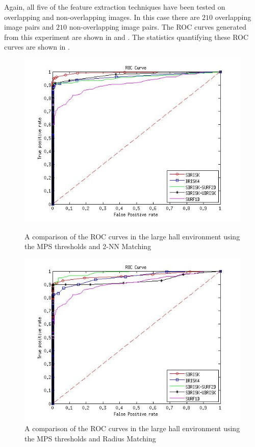Again, all five of the feature extraction techniques have been tested on overlapping and non-overlapping images. In this case there are $210$ overlapping image pairs and $210$ non-overlapping image pairs. The ROC curves generated from this experiment are shown in  and . The statistics quantifying these ROC curves are shown in .\\

\begin{figure}[h!]
\begin{minipage}[b]{0.5\linewidth}
\includegraphics[scale=0.4]{../Drawings/dataset3_ROC_General_KNN.jpg}
\caption{A comparison of the ROC curves in the large hall environment using the MPS thresholds and 2-NN Matching}
\label{fig:compareKnnOffice3}
\end{minipage}
\hspace{0.5cm}
\begin{minipage}[b]{0.5\linewidth}
\includegraphics[scale=0.4]{../Drawings/dataset3_ROC_General_Hamming.jpg}
\caption{A comparison of the ROC curves in the large hall environment using the MPS thresholds and Radius Matching}
\label{fig:compareHammingOffice3}
\end{minipage}
\end{figure}

